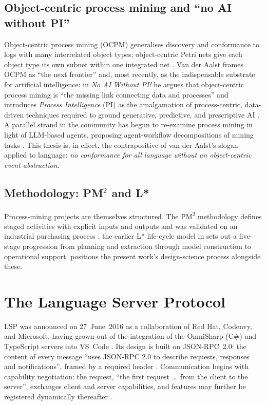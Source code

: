 \subsection{Object-centric process mining and ``no AI without PI''}
\label{sec:bg-ocpm}

Object-centric process mining (OCPM) generalises discovery and conformance to
logs with many interrelated object types; object-centric Petri nets give each
object type its own subnet within one integrated net \citep{ocpn-2020}. Van der
Aalst frames OCPM as ``the next frontier'' and, most recently, as the
indispensable substrate for artificial intelligence: in \emph{No AI Without PI!}
he argues that object-centric process mining is ``the missing link connecting
data and processes'' and introduces \emph{Process Intelligence} (PI) as the
amalgamation of process-centric, data-driven techniques required to ground
generative, predictive, and prescriptive AI \citep{noai-nopi-2025}. A parallel
strand in the community has begun to re-examine process mining in light of
LLM-based agents, proposing agent-workflow decompositions of mining tasks
\citep{rethinking-pm-agents-2024}. This thesis is, in effect, the contrapositive
of van der Aalst's slogan applied to language: \emph{no conformance for all
language without an object-centric event abstraction}.

\subsection{Methodology: PM\texorpdfstring{$^2$}{2} and L*}

Process-mining projects are themselves structured. The PM\textsuperscript{2}
methodology defines staged activities with explicit inputs and outputs and was
validated on an industrial purchasing process \citep{pm2-2015}; the earlier L*
life-cycle model in \citet{vdaalst-book-2016} sets out a five-stage progression
from planning and extraction through model construction to operational support.
 positions the present work's design-science process
alongside these.

\section{The Language Server Protocol}
\label{sec:bg-lsp}

LSP was announced on 27~June~2016 as a collaboration of Red Hat, Codenvy, and
Microsoft, having grown out of the integration of the OmniSharp (C\#) and
TypeScript servers into VS~Code \citep{lsp-redhat-2016}. Its design is built on
JSON-RPC~2.0: the content of every message ``uses JSON-RPC 2.0 to describe
requests, responses and notifications'', framed by a required 
header \citep{lsp-spec-318}. Communication begins with capability negotiation:
the  request, ``the first request \dots\ from the client to the
server'', exchanges client and server capabilities, and features may further be
registered dynamically thereafter \citep{lsp-spec-318}.

